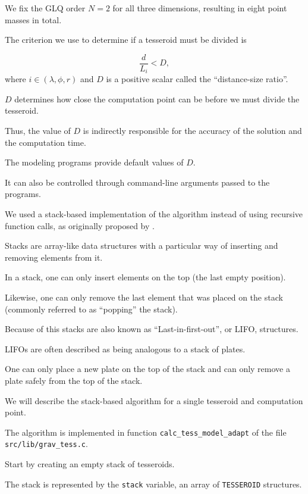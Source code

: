 \documentclass[paper,twocolumn]{geophysics}
\begin{document}
We fix the GLQ order $N=2$ for all three dimensions, resulting in eight point
masses in total.

The criterion we use to determine if a tesseroid must be divided is

\begin{equation}
    \frac{d}{L_i} < D,
    \label{eq:condition}
\end{equation}
\noindent
where $i \in (\lambda, \phi, r)$
and $D$ is a positive scalar called the ``distance-size ratio''.

$D$ determines how close the
computation point can be before we must divide the tesseroid.

Thus, the value of $D$ is indirectly responsible for
the accuracy of the solution and the computation time.

The modeling programs provide default values of $D$.

It can also be controlled through command-line arguments passed to the
programs.



We used a stack-based implementation of the algorithm instead of using
recursive function calls, as  originally proposed by \citet{Li2011}.

Stacks are array-like data structures with a particular way of inserting and
removing elements from it.

In a stack, one can only insert elements on the top (the last empty position).

Likewise,
one can only remove the last element that was placed on the stack
(commonly referred to as ``popping'' the stack).

Because of this stacks are also known as ``Last-in-first-out'', or LIFO,
structures.

LIFOs are often described as being analogous to a stack of plates.

One can only place a new plate on the top of the stack and
can only remove a plate safely from the top of the stack.


We will describe the stack-based algorithm for a single tesseroid and
computation point.

The algorithm is implemented in function \texttt{calc\_tess\_model\_adapt}
of the file \texttt{src/lib/grav\_tess.c}.


Start by creating an empty stack of tesseroids.

The  stack is represented by the \texttt{stack} variable,
an array of \texttt{TESSEROID} structures.
\end{document}
